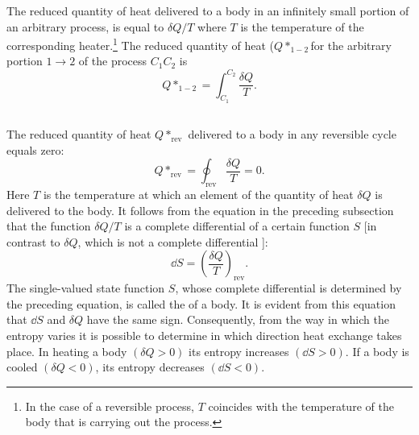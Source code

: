 The reduced quantity of heat delivered to a body in an infinitely small portion of an arbitrary process, is equal to $\delta Q/T$ where $T$ is the temperature of the corresponding heater.\footnote{In the case of a reversible process, $T$ coincides with the tem­perature of the body that is carrying out the process.} The reduced quantity of heat ($Q*_{1-2}$for the arbitrary portion $1 \to 2$ of the process $C_{1}C_{2}$ is
\begin{equation*}%
Q*_{1-2} = \int_{C_{1}}^{C_{2}} \frac{\delta Q}{T}. 
\end{equation*}

\subsection{}\label{11.4.2} The reduced quantity of heat $Q*_{\textrm{rev}}$ delivered to a body in any reversible cycle equals zero:
\begin{equation*}%
Q*_{\textrm{rev}} = \oint_{\textrm{rev}} \frac{\delta Q}{T} = 0.
\end{equation*}
Here $T$ is the temperature at which an element of the quantity of heat $\delta Q$ is delivered to the body. It follows from the equation in the preceding subsection that the function $\delta Q/T$ is a complete differential of a certain function $S$ [in contrast to $\delta Q$, which is not a complete differential ]:
\begin{equation*}%
\dd S = \left( \frac{\delta Q}{T} \right)_{\textrm{rev}}.
\end{equation*}
The single-valued state function  $S$, whose complete differential is determined by the preceding equation, is called the  of a body. It is evident from this equation that $\dd S$ and $\delta Q$ have the same sign. Consequently, from the way in which the entropy varies it is possible to determine in which direction heat exchange  takes place. In heating a body $(\delta Q > 0)$ its entropy increases $(\dd S >0)$. If a body is cooled $(\delta Q < 0)$, its entropy decreases $(\dd S < 0)$.

